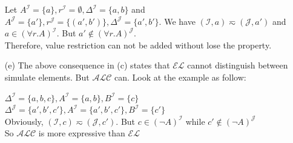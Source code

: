 \documentclass[12pt]{article}
\def \ALC {\mathcal{ALC}}
\def \J {\mathcal{J}}
\def \I {\mathcal{I}}
\begin{document}
\begin{enumerate}
        Let $ A^{\mathcal{I}} = \{a\}, r^{\mathcal{I}} = \emptyset, \Delta^{\mathcal{I}} = \{a, b\} $ 
        and $ A^{\mathcal{J}} = \{a'\}, r^{\mathcal{J}} = \{(a',b')\}, \Delta^{\mathcal{J}} = \{a', b'\} $.
        We have $ (\mathcal{I}, a) \eqsim (\mathcal{J}, a') $ and 
        $ a \in (\forall r.A)^{\mathcal{I}} $.
        But  $ a' \notin (\forall r.A)^{\mathcal{J}}$.\\
        Therefore, value restriction can not be added without lose the property. \par
        \item [(e)]
        The above consequence in (c) states that $\mathcal{EL}$ cannot distinguish between simulate elements. But $\mathcal{ALC}$ can. Look at the example as follow: \par
        $\Delta^{\I} = \{a,b,c\},A^{\I} = \{a, b\},B^{\I} = \{c\}$\\
        $\Delta^{\J} = \{a',b',c'\},A^{\I} = \{a', b', c'\},B^{\I} = \{c'\}$\\
        Obviously, $(\I,c) \eqsim (\J, c')$. But $c \in (\neg A)^{\I}$ while $c' \not \in (\neg A)^{\J}$\\
        So $\ALC$ is more expressive than $\mathcal{EL}$\\
    \end{enumerate}


    \newpage
\end{document}

